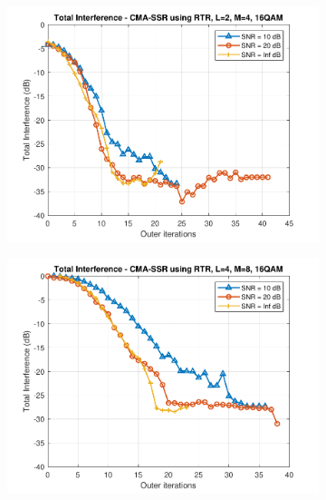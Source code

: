 \begin{figure}
\begin{subfigure}[b]{0.45\textwidth}
		\includegraphics[width=\linewidth]{./figs/BF_RTR_TI_16QAM_L=2_M=4_K=1000.pdf}
		\label{fig:rtr_ti16_24}
	\end{subfigure}
	\begin{subfigure}[b]{0.45\textwidth}
		\includegraphics[width=\linewidth]{./figs/BF_RTR_TI_16QAM_L=4_M=8_K=1000.pdf}
		\label{fig:rtr_ti16_48}
	\end{subfigure}
	\begin{subfigure}[b]{0.45\textwidth}

\end{subfigure}
\end{figure}
